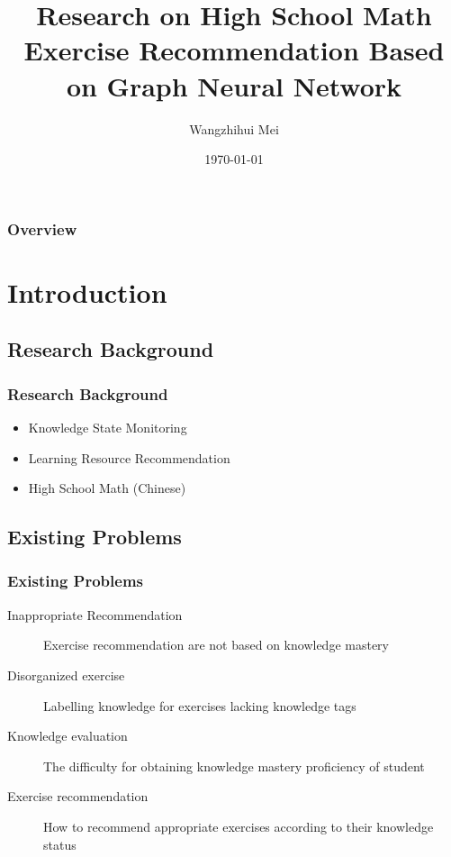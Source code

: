 \documentclass{beamer}
\title[Exercise Recommendation]{Research on High School Math Exercise Recommendation Based on Graph Neural Network} %
\author{Wangzhihui Mei} %
\institute[UOW] 
{
University of Wollongong \\ %
\medskip
\textit{maywzh@gmail.com} %
}
\date{\today} %
\begin{document}
\begin{frame}
  \titlepage %
\end{frame}

\begin{frame}
  \frametitle{Overview} %
  \tableofcontents %
\end{frame}


\section{Introduction}
\subsection{Research Background}
\begin{frame}
  \frametitle{Research Background}
  \begin{itemize}
    \item Knowledge State Monitoring
    \item Learning Resource Recommendation
    \item High School Math (Chinese)
  \end{itemize}
\end{frame}

\subsection{Existing Problems}
\begin{frame}
  \frametitle{Existing Problems}
  \begin{description}
    \item[Inappropriate Recommendation] Exercise recommendation are not based on knowledge mastery
    \item[Disorganized exercise] Labelling knowledge for exercises lacking knowledge tags
    \item[Knowledge evaluation] The difficulty for obtaining knowledge mastery proficiency of student
    \item[Exercise recommendation] How to recommend appropriate exercises according to their knowledge status
  \end{description}
\end{frame}
\end{document}
